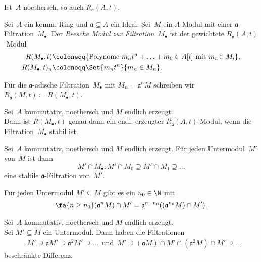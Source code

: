 \documentclass{cheat-sheet}
\newcommand{\aaa}{\mathfrak{a}}
\begin{document}
\begin{prop}
  Ist~$A$ noethersch, so auch $R_\aaa(A, t)$.
\end{prop}

\begin{defn}
  Sei~$A$ ein komm. Ring und $\aaa \subseteq A$ ein Ideal.
  Sei~$M$ ein $A$-Modul mit einer $\aaa$-Filtration~$M_\bullet$.
  Der \emph{Reesche Modul} \textit{zur Filtration~$M_\bullet$} ist der gewichtete $R_\aaa(A, t)$-Modul
  \begin{align*}
    R(M_\bullet, t) & \coloneqq \{ \text{Polynome } m_n t^n + \ldots + m_0 \in A[t] \text{ mit } m_i \in M_i \}, \\
    R(M_\bullet, t)_n & \coloneqq \Set{m_n t^n}{m_n \in M_n}.
  \end{align*}
\end{defn}

\begin{nota}
  Für die $\aaa$-adische Filtration~$M_\bullet$ mit $M_n = \aaa^n M$ schreiben wir
  $
    R_\aaa(M, t) \coloneqq R(M_\bullet, t)
  $.
\end{nota}

\begin{prop}
  Sei~$A$ kommutativ, noethersch und $M$ endlich erzeugt. \\
  Dann ist $R(M_\bullet, t)$ genau dann ein endl. erzeugter $R_\aaa(A, t)$-Modul, wenn die Filtration~$M_\bullet$ stabil ist.
\end{prop}


\begin{prop}
  Sei~$A$ kommutativ, noethersch und $M$ endlich erzeugt.
  Für jeden Untermodul~$M'$ von~$M$ ist dann
  \[
    M' \cap M_\bullet : M' \cap M_0 \supseteq M' \cap M_1 \supseteq \ldots
  \]
   eine stabile $\aaa$-Filtration von~$M'$.
\end{prop}

\begin{kor}
  Für jeden Untermodul $M' \subseteq M$ gibt es ein $n_0 \in \N$ mit
  \[
    \fa{n \geq n_0} (\aaa^n M) \cap M' = \aaa^{n - n_0} ((\aaa^{n_0} M) \cap M').
  \]
\end{kor}

\begin{kor}
  Sei~$A$ kommutativ, noethersch und $M$ endlich erzeugt. \\
  Sei $M' \subseteq M$ ein Untermodul.
  Dann haben die Filtrationen
  \begin{align*}
    & M' \supseteq \aaa M' \supseteq \aaa^2 M' \supseteq \ldots
    \enspace \text{und} \enspace
    M' \supseteq (\aaa M) \cap M' \cap (\aaa^2 M) \cap M' \supseteq \ldots
  \end{align*}
  beschränkte Differenz.
\end{kor}
\end{document}
